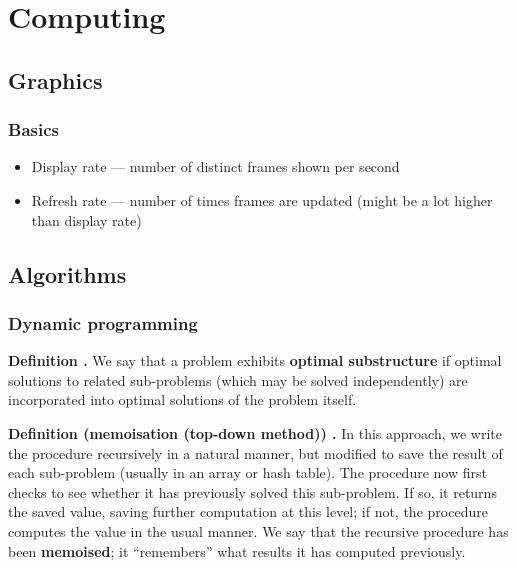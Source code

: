 \chapter{Computing}

\section{Graphics}

\subsection{Basics}

\begin{itemize}
	\item Display rate --- number of distinct frames shown per second
	\item Refresh rate --- number of times frames are updated (might be a lot higher than display rate)
\end{itemize}

\section{Algorithms}
\subsection{Dynamic programming}

\begin{shaded}
\textbf{Definition \cite{clrs_algorithms}.} We say that a problem exhibits \textbf{optimal substructure} if optimal solutions to related sub-problems (which may be solved independently) are incorporated into optimal solutions of the problem itself.
\end{shaded}

\begin{shaded}
\textbf{Definition (memoisation (top-down method)) \cite{clrs_algorithms}.} In this approach, we write the procedure recursively in a natural manner, but modified to save the result of each sub-problem (usually in an array or hash table). The procedure now first checks to see whether it has previously solved this sub-problem. If so, it returns the saved value, saving further computation at this level; if not, the procedure computes the value in the usual manner. We say that the recursive procedure has been \textbf{memoised}; it ``remembers'' what results it has computed previously.
\end{shaded}

